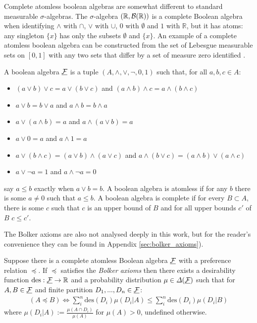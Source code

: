 Complete atomless boolean algebras are somewhat different to standard measurable $\sigma$-algebras. The $\sigma$-algebra $(\mathbb{R},\mathcal{B}(\mathbb{R}))$ is a complete Boolean algebra when identifying $\land$ with $\cap$, $\lor$ with $\cup$, $0$ with $\emptyset$ and $1$ with $\mathbb{R}$, but it has atoms: any singleton $\{x\}$ has only the subsets $\emptyset$ and $\{x\}$. An example of a complete atomless boolean algebra can be constructed from the set of Lebesgue measurable sets on $[0,1]$ with any two sets that differ by a set of measure zero identified \citet{bolker_simultaneous_1967}.

\begin{definition}\label{def:c_atom_ba}
A boolean algebra $\underline{\mathcal{F}}$ is a tuple $(A,\land,\lor,\neg,0,1)$ such that, for all $a,b,c\in A$:
\begin{itemize}
    \item $(a\lor b)\lor c = a\lor (b\lor c)$ and $(a\land b)\land c = a\land (b\land c)$
    \item $a\lor b = b\lor a$ and $a\land b = b\land a$
    \item $a\lor (a\land b) = a$ and $a\land(a\lor b) = a$
    \item $a\lor 0 = a$ and $a\land 1=a$
    \item $a\lor(b\land c) = (a\lor b) \land (a\lor c)$ and $a\land(b\lor c) = (a\land b) \lor (a\land c)$
    \item $a\lor \neg a = 1$ and $a\land \neg a = 0$
\end{itemize}
say $a\leq b$ exactly when $a\lor b = b$. A boolean algebra is atomless if for any $b$ there is some $a\neq 0$ such that $a\leq b$. A boolean algebra is complete if for every $B\subset A$, there is some $c$ such that $c$ is an upper bound of $B$ and for all upper bounds $c'$  of $B$ $c\leq c'$. 
\end{definition}

The Bolker axioms are also not analysed deeply in this work, but for the reader's convenience they can be found in Appendix \ref{sec:bolker_axioms}).

\begin{theorem}\label{th:bolker_jeffrey}
Suppose there is a complete atomless Boolean algebra $\underline{\mathcal{F}}$ with a preference relation $\preceq$. If $\preceq$ satisfies the \emph{Bolker axioms} then there exists a desirability function $\text{des}:\underline{\mathcal{F}}\to\mathbb{R}$ and a probability distribution $\mu\in \Delta(\underline{\mathcal{F}})$ such that for $A,B\in \underline{\mathcal{F}}$ and finite partition $D_1,...,D_n\in \underline{\mathcal{F}}$:
\begin{align}
    (A \preceq B) \iff \sum_{i}^n \text{des}(D_i) \mu(D_i|A) \leq \sum_{i}^n \text{des}(D_i) \mu(D_i|B) \label{eq:ev_dec_theory}
\end{align}
where $\mu(D_i|A):=\frac{\mu(A\cap D_i)}{\mu(A)}$ for $\mu(A)>0$, undefined otherwise.
\end{theorem}

